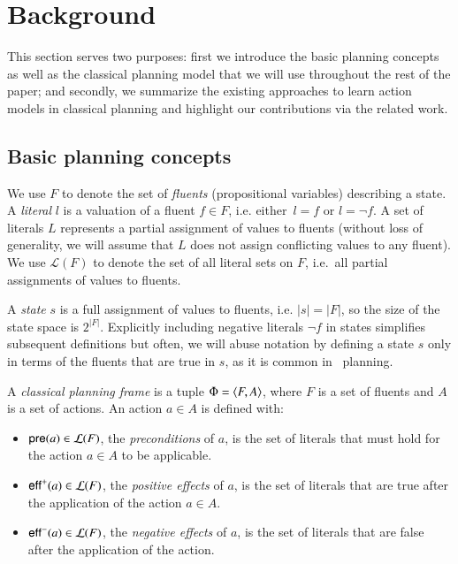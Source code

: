 
\section{Background}
\label{sec:background}

This section serves two purposes: first we introduce the basic planning concepts as well as the classical planning model that we will use throughout the rest of the paper; and secondly, we summarize the existing approaches to learn action models in classical planning and highlight our contributions via the related work.


\subsection{Basic planning concepts}
\label{basic_planning}


We use $F$ to denote the set of {\em fluents} (propositional variables) describing a state. A {\em literal} $l$ is a valuation of a fluent $f\in F$, i.e. either~$l=f$ or $l=\neg f$. A set of literals $L$ represents a partial assignment of values to fluents (without loss of generality, we will assume that $L$ does not assign conflicting values to any fluent). We use $\mathcal{L}(F)$ to denote the set of all literal sets on $F$, i.e.~all partial assignments of values to fluents.

A {\em state} $s$ is a full assignment of values to fluents, i.e. $|s|=|F|$, so the size of the state space is $2^{|F|}$. Explicitly including negative literals $\neg f$ in states simplifies subsequent definitions but often, we will abuse notation by defining a state $s$ only in terms of the fluents that are true in $s$, as it is common in \strips\ planning.

A {\em classical planning frame} is a tuple $\Phi={\langle F,A \rangle}$, where $F$ is a set of fluents and $A$ is a set of actions. An action $a\in A$ is defined with:


\begin{itemize}
\item $\mathsf{pre}(a)\in\mathcal{L}(F)$, the {\em preconditions} of $a$, is the set of literals that must hold for the action $a\in A$ to be applicable.
\item $\mathsf{eff}^+(a)\in\mathcal{L}(F)$, the {\em positive effects} of $a$, is the set of literals that are true after the application of the action $a\in A$.
\item $\mathsf{eff}^-(a)\in\mathcal{L}(F)$, the {\em negative effects} of $a$, is the set of literals that are false after the application of the action.
\end{itemize}

